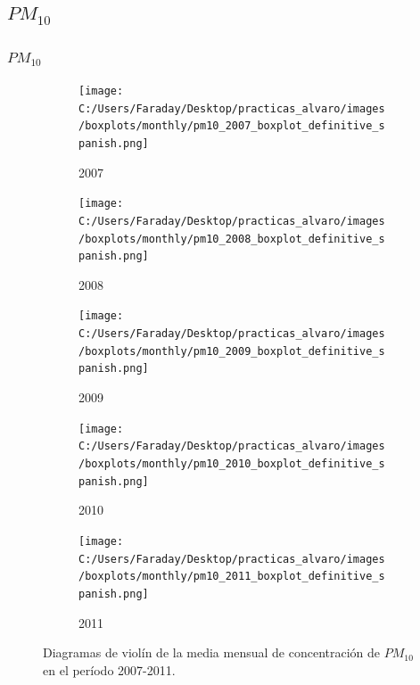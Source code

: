 \documentclass[12pt]{beamer}
\begin{document}
\subsection{$PM_{10}$}
\begin{frame}[squeeze]
\frametitle{$PM_{10}$}
\begin{figure}[H]
\centering
\begin{subfigure}[H]{0.32\textwidth}
\texttt{[image: C:/Users/Faraday/Desktop/practicas\_alvaro/images/boxplots/monthly/pm10\_2007\_boxplot\_definitive\_spanish.png]}
\captionsetup{labelformat=empty}
\caption{\scriptsize 2007}
\label{fig:box-pm10-2007}
\end{subfigure}
%
\begin{subfigure}[H]{0.32\textwidth}
\texttt{[image: C:/Users/Faraday/Desktop/practicas\_alvaro/images/boxplots/monthly/pm10\_2008\_boxplot\_definitive\_spanish.png]}
\captionsetup{labelformat=empty}
\caption{\scriptsize 2008}
\label{fig:box-pm10-2008}
\end{subfigure}
%
\begin{subfigure}[H]{0.32\textwidth}
\texttt{[image: C:/Users/Faraday/Desktop/practicas\_alvaro/images/boxplots/monthly/pm10\_2009\_boxplot\_definitive\_spanish.png]}
\captionsetup{labelformat=empty}
\caption{\scriptsize 2009}
\label{fig:box-pm10-2009}
\end{subfigure}

\begin{subfigure}[H]{0.32\textwidth}
\texttt{[image: C:/Users/Faraday/Desktop/practicas\_alvaro/images/boxplots/monthly/pm10\_2010\_boxplot\_definitive\_spanish.png]}
\captionsetup{labelformat=empty}
\caption{\scriptsize 2010}
\label{fig:box-pm10-2010}
\end{subfigure}
%
\begin{subfigure}[H]{0.32\textwidth}
\texttt{[image: C:/Users/Faraday/Desktop/practicas\_alvaro/images/boxplots/monthly/pm10\_2011\_boxplot\_definitive\_spanish.png]}
\captionsetup{labelformat=empty}
\caption{\scriptsize 2011}
\label{fig:box-pm10-2011}
\end{subfigure}
\caption{\scriptsize Diagramas de violín de la media mensual de concentración de $PM_{10}$ en el período 2007-2011.}
\label{fig:box-pm10-monthly}
\end{figure}
\end{frame}
\end{document}
